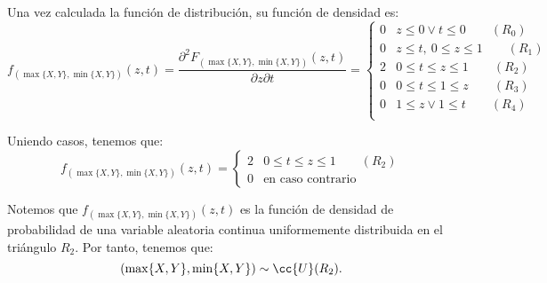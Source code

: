 \documentclass[12pt]{article}
\begin{document}
\begin{ejercicio}
\begin{enumerate}
            Una vez calculada la función de distribución, su función de densidad es:
            \begin{equation*}
                f_{(\max\{X,Y\},\min\{X,Y\})}(z,t) = \dfrac{\partial^2 F_{(\max\{X,Y\},\min\{X,Y\})}(z,t)}{\partial z\partial t}
                = \begin{cases}
                    0 & z\leq 0 \lor t\leq 0 \qquad (R_0)\\
                    0 & z\leq t,~0\leq z\leq 1 \qquad (R_1)\\
                    2 & 0\leq t\leq z\leq 1 \qquad (R_2)\\
                    0 & 0\leq t\leq 1\leq z \qquad (R_3)\\
                    0 & 1\leq z \lor 1\leq t \qquad (R_4)\\
                \end{cases}
            \end{equation*}

            Uniendo casos, tenemos que:
            \begin{equation*}
                f_{(\max\{X,Y\},\min\{X,Y\})}(z,t)
                = \begin{cases}
                    2 & 0\leq t\leq z\leq 1 \qquad (R_2)\\
                    0 & \text{en caso contrario}
                \end{cases}
            \end{equation*}

            Notemos que $f_{(\max\{X,Y\},\min\{X,Y\})}(z,t)$ es la función de densidad de probabilidad de una variable aleatoria continua uniformemente distribuida en el triángulo $R_2$. Por tanto, tenemos que:
            \begin{equation*}
                (\max\{X,Y\},\min\{X,Y\})\sim \cc{U}(R_2).
            \end{equation*}
        \end{enumerate}
    \end{ejercicio}
\end{document}
